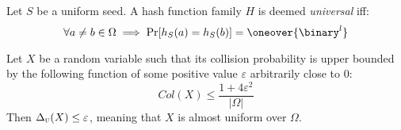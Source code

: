 \begin{definition}
    Let $S$ be a uniform seed. A hash function family $H$ is deemed \emph{universal} iff:
    \[
        \forall a \neq b \in \Omega \implies \Pr[h_S(a) = h_S(b)] = \oneover{\binary^l}
    \]
\end{definition}

\begin{lemma} \label{lem:colbound}
    Let $X$ be a random variable such that its collision probability is upper bounded by the following function of some positive value $\varepsilon$ arbitrarily close to $0$:
    \[
        Col(X) \leq \frac{1 + 4\varepsilon^2}{|\Omega|}
    \]
    Then $\Delta_\textsc{u}(X) \leq \varepsilon$, meaning that $X$ is almost uniform over $\Omega$.
\end{lemma}


